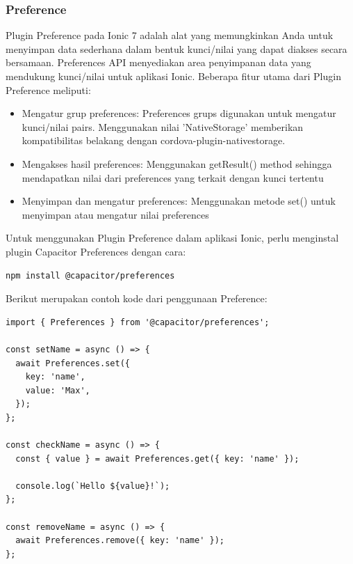 \subsubsection{Preference}
Plugin Preference pada Ionic 7 adalah alat yang memungkinkan Anda untuk menyimpan data sederhana dalam bentuk kunci/nilai yang dapat diakses secara bersamaan. Preferences API menyediakan area penyimpanan data yang mendukung kunci/nilai untuk aplikasi Ionic. Beberapa fitur utama dari Plugin Preference meliputi:
\begin{itemize}
    \item Mengatur grup preferences: Preferences grups digunakan untuk mengatur kunci/nilai pairs. Menggunakan nilai 'NativeStorage' memberikan kompatibilitas belakang dengan cordova-plugin-nativestorage.
    \item Mengakses hasil preferences: Menggunakan getResult() method sehingga mendapatkan nilai dari preferences yang terkait dengan kunci tertentu
    \item Menyimpan dan mengatur preferences: Menggunakan metode set() untuk menyimpan atau mengatur nilai preferences
\end{itemize}

Untuk menggunakan Plugin Preference dalam aplikasi Ionic, perlu menginstal plugin Capacitor Preferences dengan cara:

\begin{lstlisting}[language=HTML, caption=Kode untuk menginstal plugin Preference, label=kode:install-preference-capacitor]
npm install @capacitor/preferences
\end{lstlisting}

Berikut merupakan contoh kode dari penggunaan Preference:

\begin{lstlisting}[language=HTML, caption=Contoh kode dari plugin Preference, label=kode:preference-capacitor-example]
import { Preferences } from '@capacitor/preferences';

const setName = async () => {
  await Preferences.set({
    key: 'name',
    value: 'Max',
  });
};

const checkName = async () => {
  const { value } = await Preferences.get({ key: 'name' });

  console.log(`Hello ${value}!`);
};

const removeName = async () => {
  await Preferences.remove({ key: 'name' });
};
\end{lstlisting}


